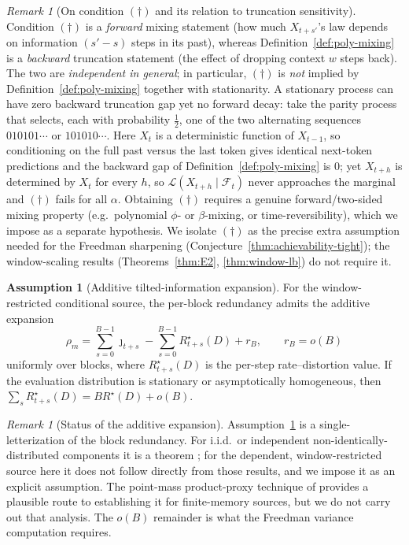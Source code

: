\documentclass[11pt]{article}
\newcommand{\F}{\mathcal{F}}
\theoremstyle{plain}
\theoremstyle{definition}
\newtheorem{assumption}[theorem]{Assumption}
\theoremstyle{remark}
\newtheorem{remark}[theorem]{Remark}
\begin{document}
\begin{remark}[On condition $(\dagger)$ and its relation to truncation sensitivity]
\label{rmk:forward-decay}
Condition $(\dagger)$ is a \emph{forward} mixing statement (how much
$X_{t+s'}$'s law depends on information $(s'-s)$ steps in its past),
whereas Definition~\ref{def:poly-mixing} is a \emph{backward}
truncation statement (the effect of dropping context $w$ steps
back). The two are \emph{independent in general}; in particular,
$(\dagger)$ is \emph{not} implied by Definition~\ref{def:poly-mixing}
together with stationarity. A stationary process can have zero
backward truncation gap yet no forward decay: take the parity
process that selects, each with probability $\tfrac12$, one of the
two alternating sequences $010101\cdots$ or $101010\cdots$. Here
$X_t$ is a deterministic function of $X_{t-1}$, so conditioning on
the full past versus the last token gives identical next-token
predictions and the backward gap of
Definition~\ref{def:poly-mixing} is $0$; yet $X_{t+h}$ is determined
by $X_t$ for every $h$, so $\mathcal L(X_{t+h} \mid \F_t)$ never
approaches the marginal and $(\dagger)$ fails for all $\alpha$.
Obtaining $(\dagger)$ requires a genuine forward/two-sided mixing
property (e.g.\ polynomial $\phi$- or $\beta$-mixing, or
time-reversibility), which we impose as a separate hypothesis. We
isolate $(\dagger)$ as the precise extra assumption needed for the
Freedman sharpening (Conjecture~\ref{thm:achievability-tight}); the
window-scaling results (Theorems~\ref{thm:E2},
\ref{thm:window-lb}) do not require it.
\end{remark}

\begin{assumption}[Additive tilted-information expansion]
\label{ass:additive-tilted}
For the window-restricted conditional source, the per-block
redundancy admits the additive expansion
\[
\rho_m = \sum_{s=0}^{B-1} \jmath_{t+s}
       - \sum_{s=0}^{B-1} R^\star_{t+s}(D) + r_B,
\qquad r_B = o(B)
\]
uniformly over blocks, where $R^\star_{t+s}(D)$ is the per-step
rate--distortion value. If the evaluation distribution is
stationary or asymptotically homogeneous, then
$\sum_s R^\star_{t+s}(D) = B R^\star(D) + o(B)$.
\end{assumption}

\begin{remark}[Status of the additive expansion]
Assumption~\ref{ass:additive-tilted} is a single-letterization of
the block redundancy. For i.i.d.\ or independent
non-identically-distributed components it is a theorem
\citep{kostina2012fixed,tasci2024dispersion}; for the
dependent, window-restricted source here it does not follow
directly from those results, and we impose it as an explicit
assumption. The point-mass product-proxy technique of
\citet{tasci2024dispersion} provides a plausible route to
establishing it for finite-memory sources, but we do not carry out
that analysis. The $o(B)$ remainder is what the Freedman variance
computation requires.
\end{remark}
\end{document}
